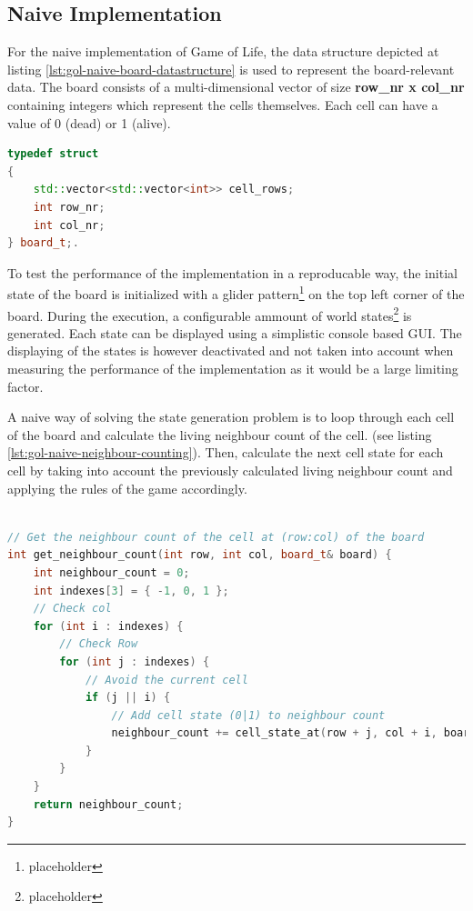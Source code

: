 \documentclass[a4paper,english,12pt,twoside=false]{scrartcl} %
\begin{document}
\subsection{Naive Implementation}

For the naive implementation of Game of Life, the data structure depicted at listing \ref{lst:gol-naive-board-datastructure} is used to represent the board-relevant data. The board consists of a multi-dimensional vector of size \textbf{row{\_}nr x col{\_}nr}  containing integers which represent the cells themselves. Each cell can have a value of 0 (dead) or 1 (alive).

\pagebreak

\begin{lstlisting}[caption={Game of Life Board Datastructure},label={lst:gol-naive-board-datastructure},language=C++]
typedef struct
{
    std::vector<std::vector<int>> cell_rows;
    int row_nr;
    int col_nr;
} board_t;.
\end{lstlisting}

To test the performance of the implementation in a reproducable way, the initial state of the board is initialized with a glider pattern\footnote{placeholder} on the top left corner of the board. During the execution, a configurable ammount of world states\footnote{placeholder} is generated. Each state can be displayed using a simplistic console based GUI. The displaying of the states is however deactivated and not taken into account when measuring the performance of the implementation as it would be a large limiting factor. \newline

A naive way of solving the state generation problem is to loop through each cell of the board and calculate the living neighbour count of the cell. (see listing \ref{lst:gol-naive-neighbour-counting}). Then, calculate the next cell state for each cell by taking into account the previously calculated living neighbour count and applying the rules of the game accordingly. 

\begin{lstlisting}[caption={Naive Neighbour Counting},label={lst:gol-naive-neighbour-counting},language=C++]

// Get the neighbour count of the cell at (row:col) of the board
int get_neighbour_count(int row, int col, board_t& board) {
    int neighbour_count = 0;
    int indexes[3] = { -1, 0, 1 };
    // Check col
    for (int i : indexes) {
        // Check Row
        for (int j : indexes) {
            // Avoid the current cell
            if (j || i) {
                // Add cell state (0|1) to neighbour count
                neighbour_count += cell_state_at(row + j, col + i, board);
            }
        }
    }
    return neighbour_count;
}

\end{lstlisting}
\end{document}
